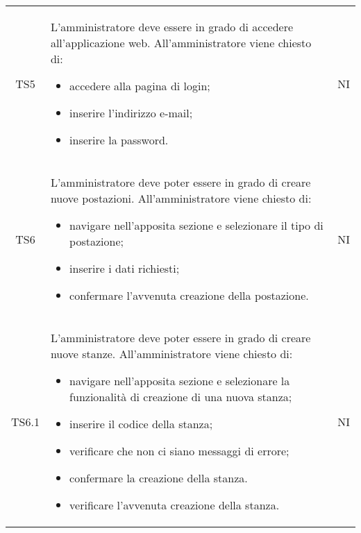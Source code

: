 {\begin{longtable}{ c C{11cm} c }
        TS5&
        \begin{flushleft}
            L'amministratore deve essere in grado di accedere all'applicazione web.
            All'amministratore viene chiesto di:
        \end{flushleft}
        \begin{itemize}
            \item accedere alla pagina di login;
            \item inserire l'indirizzo e-mail;
            \item inserire la password.
        \end{itemize}&
        NI\\

        TS6&
        \begin{flushleft}
            L'amministratore deve poter essere in grado di creare nuove postazioni.
            All'amministratore viene chiesto di:
        \end{flushleft}
        \begin{itemize}
            \item navigare nell'apposita sezione e selezionare il tipo di postazione;
            \item inserire i dati richiesti;
            \item confermare l'avvenuta creazione della postazione.
        \end{itemize}&
        NI\\

        TS6.1&
        \begin{flushleft}
            L'amministratore deve poter essere in grado di creare nuove stanze.
            All'amministratore viene chiesto di:
        \end{flushleft}
        \begin{itemize}
            \item navigare nell'apposita sezione e selezionare la funzionalità di creazione di una nuova stanza;
            \item inserire il codice della stanza;
            \item verificare che non ci siano messaggi di errore;
            \item confermare la creazione della stanza.
            \item verificare l'avvenuta creazione della stanza.
        \end{itemize}&
        NI\\


\end{longtable}}
